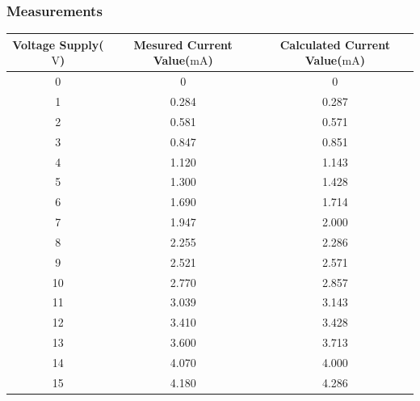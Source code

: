 \documentclass[a4paper]{article}
\begin{document}
\subsubsection{Measurements}
\begin{center}
    \begin{tabular}{|c|c|c|}
        \hline
        Voltage Supply($\si{\volt}$) & Mesured Current Value($\si{\milli\ampere}$) & Calculated
        Current Value($\si{\milli\ampere}$)\\\hline
        0&0&0\\\hline
        1&0.284&0.287\\\hline
        2&0.581&0.571\\\hline
        3&0.847&0.851\\\hline
        4&1.120&1.143\\\hline
        5&1.300&1.428\\\hline
        6&1.690&1.714\\\hline
        7&1.947&2.000\\\hline
        8&2.255&2.286\\\hline
        9&2.521&2.571\\\hline
        10&2.770&2.857\\\hline
        11&3.039&3.143\\\hline
        12&3.410&3.428\\\hline
        13&3.600&3.713\\\hline
        14&4.070&4.000\\\hline
        15&4.180&4.286\\\hline
    \end{tabular}
     
\end{center}
\end{document}
